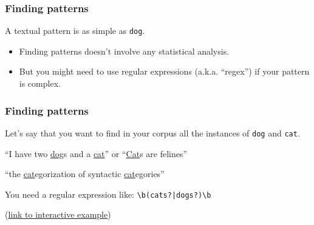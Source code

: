 \documentclass[serif, aspectratio=169]{beamer}
\begin{document}
\begin{frame}[fragile]
\frametitle{Finding patterns}

A textual pattern is as simple as \texttt{dog}.

\begin{itemize}

\item Finding patterns doesn't involve any statistical analysis.

\item But you might need to use regular expressions (a.k.a. \enquote{regex}) if your pattern is complex.

\end{itemize}

\end{frame}

\begin{frame}[fragile]
\frametitle{Finding patterns}

Let's say that you want to find in your corpus all the instances of \texttt{dog} and \texttt{cat}.

\begin{description}

\item<1->[You want to find] \enquote{I have two \underline{dog}s and a \underline{cat}} or \enquote{\underline{Cat}s are felines}

\item<2->[But you don't want to find]  \enquote{the \underline{cat}egorization of syntactic \underline{cat}egories}

\item<3-> You need a regular expression like: {\LARGE\verb=\b(cats?|dogs?)\b=} 

\end{description}

{\tiny (\href{https://regexr.com/3oqld}{link to interactive example})}

\end{frame}
\end{document}
